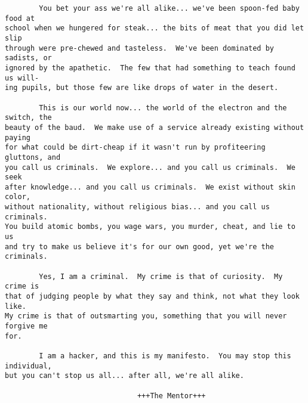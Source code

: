 \begin{center}
\begin{varwidth}{\textwidth}
\begin{verbatim}
        You bet your ass we're all alike... we've been spoon-fed baby food at
school when we hungered for steak... the bits of meat that you did let slip
through were pre-chewed and tasteless.  We've been dominated by sadists, or
ignored by the apathetic.  The few that had something to teach found us will-
ing pupils, but those few are like drops of water in the desert.

        This is our world now... the world of the electron and the switch, the
beauty of the baud.  We make use of a service already existing without paying
for what could be dirt-cheap if it wasn't run by profiteering gluttons, and
you call us criminals.  We explore... and you call us criminals.  We seek
after knowledge... and you call us criminals.  We exist without skin color,
without nationality, without religious bias... and you call us criminals.
You build atomic bombs, you wage wars, you murder, cheat, and lie to us
and try to make us believe it's for our own good, yet we're the criminals.

        Yes, I am a criminal.  My crime is that of curiosity.  My crime is
that of judging people by what they say and think, not what they look like.
My crime is that of outsmarting you, something that you will never forgive me
for.

        I am a hacker, and this is my manifesto.  You may stop this individual,
but you can't stop us all... after all, we're all alike.

                               +++The Mentor+++
\end{verbatim}
\end{varwidth}
\end{center}